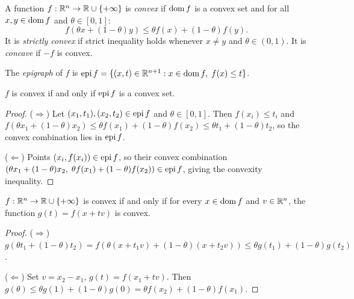 \documentclass[11pt,a4paper]{article}
\begin{document}
\begin{definition}
\label{def:convex-function}
A function $f : \mathbb{R}^n \to \mathbb{R} \cup \{+\infty\}$ is \emph{convex} if $\operatorname{dom} f$ is
a convex set and for all $x, y \in \operatorname{dom} f$ and $\theta \in [0,1]$:
\[
  f(\theta x + (1-\theta) y) \le \theta f(x) + (1-\theta) f(y).
\]
It is \emph{strictly convex} if strict inequality holds whenever $x \ne y$ and
$\theta \in (0,1)$.  It is \emph{concave} if $-f$ is convex.
\end{definition}

\begin{definition}[Epigraph]
\label{def:epigraph}
The \emph{epigraph} of $f$ is
$\operatorname{epi} f = \{(x, t) \in \mathbb{R}^{n+1} : x \in \operatorname{dom} f,\; f(x) \le t\}$.
\end{definition}

\begin{proposition}
\label{prop:epigraph}
$f$ is convex if and only if $\operatorname{epi} f$ is a convex set.
\end{proposition}

\begin{proof}
($\Rightarrow$)  Let $(x_1, t_1), (x_2, t_2) \in \operatorname{epi} f$ and
$\theta \in [0,1]$.  Then $f(x_i) \le t_i$ and
$f(\theta x_1 + (1-\theta) x_2) \le \theta f(x_1) + (1-\theta) f(x_2)
\le \theta t_1 + (1-\theta) t_2$, so the convex combination lies in $\operatorname{epi} f$.

($\Leftarrow$)  Points $(x_i, f(x_i)) \in \operatorname{epi} f$, so their convex
combination $(\theta x_1 + (1-\theta) x_2,\; \theta f(x_1) +
(1-\theta) f(x_2)) \in \operatorname{epi} f$, giving the convexity inequality.
\end{proof}

\begin{proposition}
\label{prop:line-restriction}
$f : \mathbb{R}^n \to \mathbb{R} \cup \{+\infty\}$ is convex if and only if for every
$x \in \operatorname{dom} f$ and $v \in \mathbb{R}^n$, the function $g(t) = f(x + tv)$ is convex.
\end{proposition}

\begin{proof}
($\Rightarrow$) $g(\theta t_1 + (1-\theta) t_2) =
f(\theta(x + t_1 v) + (1-\theta)(x + t_2 v)) \le
\theta g(t_1) + (1-\theta) g(t_2)$.

($\Leftarrow$)  Set $v = x_2 - x_1$, $g(t) = f(x_1 + t v)$.  Then
$g(\theta) \le \theta g(1) + (1-\theta) g(0) =
\theta f(x_2) + (1-\theta) f(x_1)$.
\end{proof}

\end{document}
